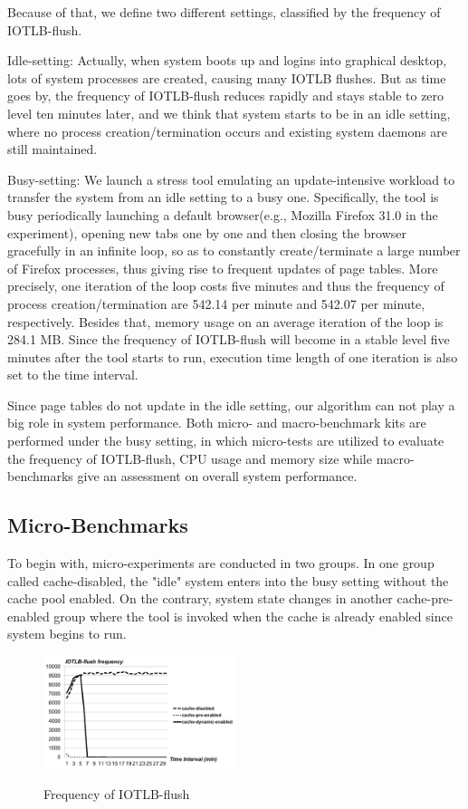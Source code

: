 Because of that, we define two different settings, classified by the frequency of IOTLB-flush.

Idle-setting: Actually, when system boots up and logins into graphical desktop, lots of system processes are created, causing many IOTLB flushes. But as time goes by, the frequency of IOTLB-flush reduces rapidly and stays stable to zero level ten minutes later, and we think that system starts to be in an idle setting, where no process creation/termination occurs and existing system daemons are still maintained.

Busy-setting: We launch a stress tool emulating an update-intensive workload to transfer the system from an idle setting to a busy one. Specifically, the tool is busy periodically launching a default browser(e.g., Mozilla Firefox 31.0 in the experiment), opening new tabs one by one and then closing the browser gracefully in an infinite loop, so as to constantly create/terminate a large number of Firefox processes, thus giving rise to frequent updates of page tables. More precisely, one iteration of the loop costs five minutes and thus the frequency of process creation/termination are 542.14 per minute and 542.07 per minute, respectively. Besides that, memory usage on an average iteration of the loop is 284.1 MB. Since the frequency of IOTLB-flush will become in a stable level five minutes after the tool starts to run, execution time length of one iteration is also set to the time interval.

Since page tables do not update in the idle setting, our algorithm can not play a big role in system performance. Both micro- and macro-benchmark kits are performed under the busy setting, in which micro-tests are utilized to evaluate the frequency of IOTLB-flush, CPU usage and memory size while macro-benchmarks give an assessment on overall system performance.

\subsection{Micro-Benchmarks}

To begin with, micro-experiments are conducted in two groups. In one group called cache-disabled, the "idle" system enters into the busy setting without the cache pool enabled. On the contrary, system state changes in another cache-pre-enabled group where the tool is invoked when the cache is already enabled since system begins to run.

\begin{figure}[ht]
\centering
\includegraphics[width=0.5\textwidth]{image/micro/iotlbflush.png} \\
\caption{Frequency of IOTLB-flush}
\label{fig:iotlbflush}
\end{figure}

